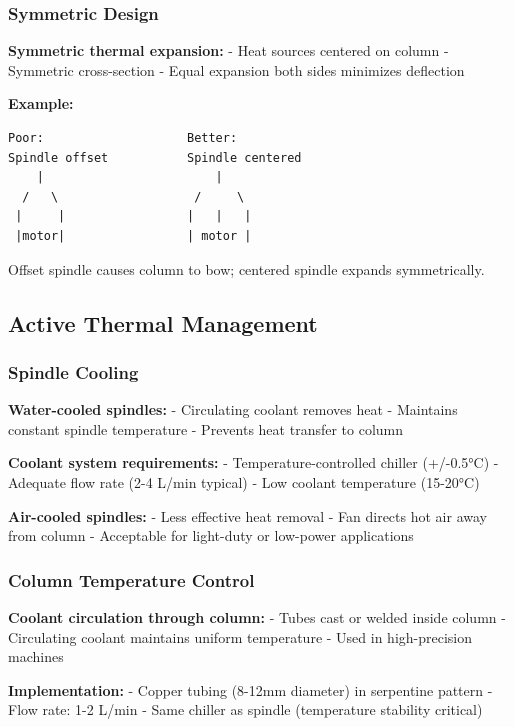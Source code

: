 \documentclass[
]{article}
\begin{document}
\subsubsection{Symmetric Design}\label{symmetric-design}

\textbf{Symmetric thermal expansion:} - Heat sources centered on column
- Symmetric cross-section - Equal expansion both sides minimizes
deflection

\textbf{Example:}

\begin{verbatim}
Poor:                    Better:
Spindle offset           Spindle centered
    |                        |
  /   \                   /     \
 |     |                 |   |   |
 |motor|                 | motor |
\end{verbatim}

Offset spindle causes column to bow; centered spindle expands
symmetrically.

\subsection{Active Thermal Management}\label{active-thermal-management}

\subsubsection{Spindle Cooling}\label{spindle-cooling}

\textbf{Water-cooled spindles:} - Circulating coolant removes heat -
Maintains constant spindle temperature - Prevents heat transfer to
column

\textbf{Coolant system requirements:} - Temperature-controlled chiller
(+/-0.5°C) - Adequate flow rate (2-4 L/min typical) - Low coolant
temperature (15-20°C)

\textbf{Air-cooled spindles:} - Less effective heat removal - Fan
directs hot air away from column - Acceptable for light-duty or
low-power applications

\subsubsection{Column Temperature
Control}\label{column-temperature-control}

\textbf{Coolant circulation through column:} - Tubes cast or welded
inside column - Circulating coolant maintains uniform temperature - Used
in high-precision machines

\textbf{Implementation:} - Copper tubing (8-12mm diameter) in serpentine
pattern - Flow rate: 1-2 L/min - Same chiller as spindle (temperature
stability critical)
\end{document}
